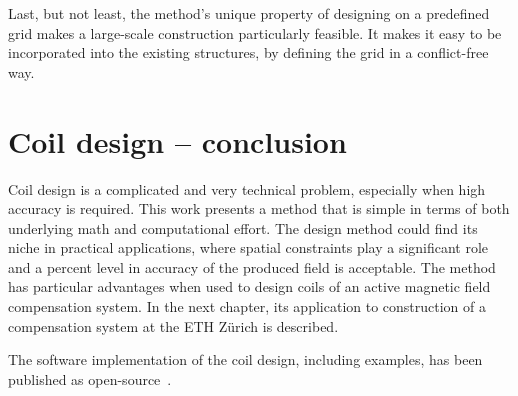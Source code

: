 Last, but not least, the method's unique property of designing on a predefined grid makes a large-scale construction particularly feasible. It makes it easy to be incorporated into the existing structures, by defining the grid in a conflict-free way.




\section*{Coil design -- conclusion}
Coil design is a complicated and very technical problem, especially when high accuracy is required. This work presents a method that is simple in terms of both underlying math and computational effort. The design method could find its niche in practical applications, where spatial constraints play a significant role and a percent level in accuracy of the produced field is acceptable. The method has particular advantages when used to design coils of an active magnetic field compensation system. In the next chapter, its application to construction of a compensation system at the ETH Zürich is described.

The software implementation of the coil design, including examples, has been published as open-source~\cite{Coilsjlcode}.
